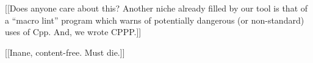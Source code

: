 \documentclass[10pt]{article}
\def\numpackages{30}
\begin{document}
% 
% 
% 
% 
% 


[[Does anyone care about this?
Another niche already filled by our tool is that of a ``macro lint''
program which warns of potentially dangerous (or non-standard) uses of Cpp.
And, we wrote CPPP.]]







[[Inane, content-free.  Must die.]]
\end{document}

